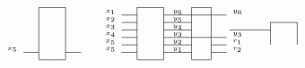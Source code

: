 \documentclass[envcountsame]{llncs}
\begin{document}
\begin{wrapfigure}{r}{83mm}\vspace{-10mm}
\[\begin{array}{cccc}
\tiny    \begin{array}{ll|l|l}
      \cline{3-3}
          & ~ &\hspace{4mm} & ~\\
          & ~ &\hspace{4mm} & ~\\
          & ~ &\hspace{4mm} & ~\\
          & ~ & & \\
          & ~ & & \\
      x_5 & ~ & & \\
        \cline{2-2} \cline{4-4}
          & & &\\
      \cline{3-3}
    \end{array}
~~& \tiny    \begin{array}{ll|l|l|l|ll}
      \cline{3-3} \cline{5-5}
      x_1    & ~ &\hspace{4mm} & ~y_6~  &\hspace{2mm}& ~ &y_6 \\
          \cline{2-2} \cline{4-6}   
      x_2    & ~ &\hspace{4mm} & ~y_5 &\hspace{2mm}& ~ & \\
          \cline{2-2} \cline{4-4} 
      x_3    &   &             & ~y_4 &         &   & \\
        \cline{2-2} \cline{4-4}  
      x_4 & ~ & &~y_3 & & & y_3\\
        \cline{2-2} \cline{4-6} 
      x_5 & ~ & &~y_2 & & &r_1\\
        \cline{2-2} \cline{4-4} \cline{6-6}
      x_5 & ~ & &~y_1 & & &r_2\\
        \cline{2-2} \cline{4-4} \cline{6-6}
          & & & & & & \\
      \cline{3-3}  \cline{5-5}
    \end{array}
~~& \tiny \hspace{-14mm}   \begin{array}{ll|l|l}
      \cline{3-3} 
          &\hspace{8mm}  & \hspace{4mm} &  \\
          \cline{2-2} 
           & ~ &\hspace{4mm} &~  \\
            &   &              &   \\

\end{array}
\end{array}\]
\end{wrapfigure}
\end{document}
